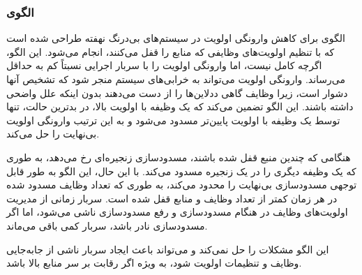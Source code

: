\subsubsection{الگوی }
\label{resourcePriorInheritSec}
\begin{RTL}
الگوی  \cite{ref4}
برای کاهش وارونگی اولویت
در سیستم‌های بی‌درنگ نهفته طراحی شده است که با تنظیم اولویت‌های
وظایفی که منابع را قفل می‌کنند، انجام می‌شود.
این الگو، اگرچه کامل نیست، اما وارونگی اولویت را با سربار اجرایی
نسبتاً کم به حداقل می‌رساند. وارونگی اولویت می‌تواند به خرابی‌های
سیستم منجر شود که تشخیص آنها دشوار است، زیرا وظایف گاهی
ددلاین‌ها را از دست می‌دهند بدون اینکه علل واضحی داشته باشند.
این الگو تضمین می‌کند که یک وظیفه با اولویت بالا، در بدترین حالت،
تنها توسط یک وظیفه با اولویت پایین‌تر مسدود می‌شود و
به این ترتیب وارونگی اولویت بی‌نهایت را حل می‌کند.
\end{RTL}
\begin{RTL}
هنگامی که چندین منبع قفل شده باشند، مسدودسازی زنجیره‌ای
رخ می‌دهد، به طوری که یک وظیفه دیگری را در یک زنجیره
مسدود می‌کند. با این حال، این الگو به طور قابل توجهی مسدودسازی بی‌نهایت
را محدود می‌کند، به طوری که تعداد وظایف مسدود شده در
هر زمان کمتر از تعداد وظایف و منابع قفل شده است.
سربار زمانی از مدیریت اولویت‌های وظایف در هنگام مسدودسازی
و رفع مسدودسازی ناشی می‌شود، اما اگر مسدودسازی نادر باشد،
سربار کمی باقی می‌ماند.
\end{RTL}
\begin{RTL}
این الگو مشکلات  را حل نمی‌کند و می‌تواند باعث ایجاد سربار ناشی
از جابه‌جایی وظایف و تنظیمات اولویت شود، به ویژه اگر رقابت بر سر منابع بالا باشد.
\end{RTL}